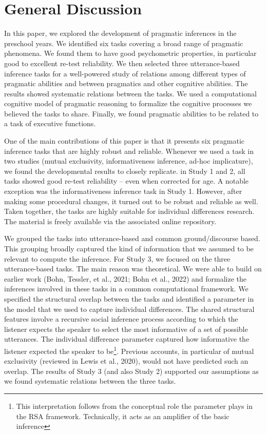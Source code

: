 \documentclass[
  man,floatsintext]{apa6}
\begin{document}
\hypertarget{general-discussion}{%
\section{General Discussion}\label{general-discussion}}

In this paper, we explored the development of pragmatic inferences in the preschool years. We identified six tasks covering a broad range of pragmatic phenomena. We found them to have good psychometric properties, in particular good to excellent re-test reliability. We then selected three utterance-based inference tasks for a well-powered study of relations among different types of pragmatic abilities and between pragmatics and other cognitive abilities. The results showed systematic relations between the tasks. We used a computational cognitive model of pragmatic reasoning to formalize the cognitive processes we believed the tasks to share. Finally, we found pragmatic abilities to be related to a task of executive functions.

One of the main contributions of this paper is that it presents six pragmatic inference tasks that are highly robust and reliable. Whenever we used a task in two studies (mutual exclusivity, informativeness inference, ad-hoc implicature), we found the developmental results to closely replicate. in Study 1 and 2, all tasks showed good re-test reliability -- even when corrected for age. A notable exception was the informativeness inference task in Study 1. However, after making some procedural changes, it turned out to be robust and reliable as well. Taken together, the tasks are highly suitable for individual differences research. The material is freely available via the associated online repository.

We grouped the tasks into utterance-based and common ground/discourse based. This grouping broadly captured the kind of information that we assumed to be relevant to compute the inference. For Study 3, we focused on the three utterance-based tasks. The main reason was theoretical. We were able to build on earlier work (Bohn, Tessler, et al., 2021; Bohn et al., 2022) and formalize the inferences involved in these tasks in a common computational framework. We specified the structural overlap between the tasks and identified a parameter in the model that we used to capture individual differences. The shared structural features involve a recursive social inference process according to which the listener expects the speaker to select the most informative of a set of possible utterances. The individual difference parameter captured how informative the listener expected the speaker to be\footnote{This interpretation follows from the conceptual role the parameter plays in the RSA framework. Technically, it acts as an amplifier of the basic inference}. Previous accounts, in particular of mutual exclusivity (reviewed in Lewis et al., 2020), would not have predicted such an overlap. The results of Study 3 (and also Study 2) supported our assumptions as we found systematic relations between the three tasks.
\end{document}
